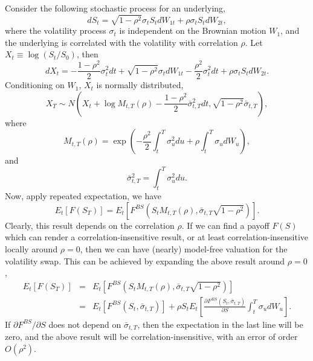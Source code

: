 \documentclass[12pt]{article}
\begin{document}
    Consider the following stochastic process for an underlying,
    \begin{equation}
      dS_t=\sqrt{1-\rho^2}\sigma_tS_tdW_{1t}+\rho\sigma_tS_tdW_{2t},
      \label{BS1}
    \end{equation}
    where the volatility process $\sigma_t$ is independent on the Brownian motion $W_1$, and the underlying is correlated
    with the volatility with correlation $\rho$. Let $X_t\equiv\log(S_t/S_0)$, then
    \begin{equation}
      dX_t=-\frac{1-\rho^2}{2}\sigma_t^2dt+\sqrt{1-\rho^2}\sigma_tdW_{1t}-\frac{\rho^2}{2}\sigma_t^2dt+\rho\sigma_tS_tdW_{2t}.
    \end{equation}
    Conditioning on $W_1$, $X_t$ is normally distributed,
    \begin{equation}
      X_T\sim N\left(X_t+\log M_{t,T}(\rho)-\frac{1-\rho^2}{2}\bar\sigma_{t,T}^2dt, \sqrt{1-\rho^2}\bar\sigma_{t,T}\right),
    \end{equation}
    where
    \begin{equation}
      M_{t,T}(\rho) = \exp\left(-\frac{\rho^2}{2}\int_t^T\sigma_u^2du+\rho\int_t^T\sigma_udW_u\right),
    \end{equation}
    and
    \begin{equation}
      \bar\sigma_{t,T}^2=\int_t^T\sigma_u^2du.
    \end{equation}
    Now, apply repeated expectation, we have
    \begin{equation}
      E_t\left[F(S_T)\right]=E_t\left[F^{BS}\left(S_tM_{t,T}(\rho),\bar\sigma_{t,T}\sqrt{1-\rho^2}\right)\right].
    \end{equation}
    Clearly, this result depends on the correlation $\rho$. If we can find a payoff $F(S)$ which can render a correlation-insensitive
    result, or at least correlation-insensitive locally around $\rho=0$, then we can have (nearly) model-free valuation for the volatility
    swap. This can be achieved by expanding the above result around $\rho=0$,
    \begin{eqnarray}
             E_t\left[F(S_T)\right]
      &=&E_t\left[F^{BS}\left(S_tM_{t,T}(\rho),\bar\sigma_{t,T}\sqrt{1-\rho^2}\right)\right]\nonumber\\
      &=&E_t\left[F^{BS}(S_t,\bar\sigma_{t,T})\right]
              + \rho S_tE_t\left[\frac{\partial F^{BS}(S_t,\bar\sigma_{t,T})}{\partial S}
                              \int_t^T\sigma_udW_u\right].
      \label{immune}
    \end{eqnarray}
    If $\partial F^{BS}/\partial S$ does not depend on $\bar\sigma_{t,T}$, then the expectation in the last line will be zero,
    and the above result will be correlation-insensitive, with an error of order $O(\rho^2)$.
\end{document}
